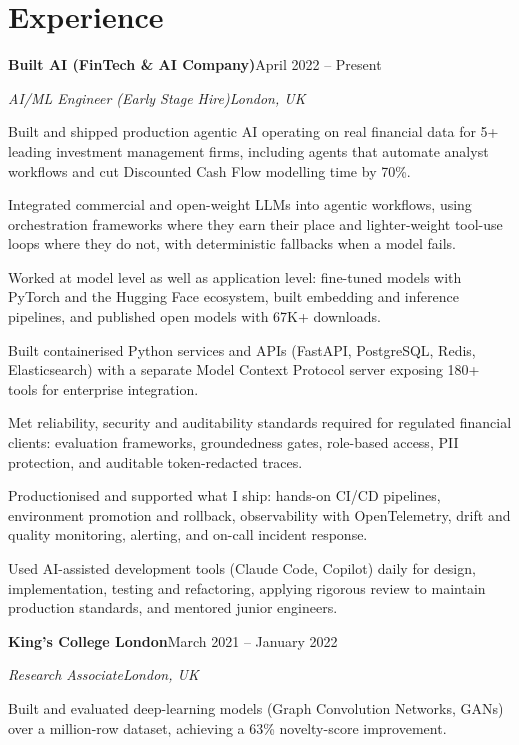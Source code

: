 \documentclass[10pt,a4paper]{article}
\newcommand{\entry}[4]{%
  {\color{company}\bfseries #1}\hfill {\color{muted}#2}\par
  \vspace{1pt}
  {\itshape #3}\hfill {\color{muted}\itshape #4}\par
  \vspace{3pt}%
}
\begin{document}
\section{Experience}
\entry{Built AI (FinTech \& AI Company)}{April 2022 -- Present}{AI/ML Engineer (Early Stage Hire)}{London, UK}
\begin{tight}
  \item Built and shipped production agentic AI operating on real financial data for 5+ leading investment management firms, including agents that automate analyst workflows and cut Discounted Cash Flow modelling time by 70\%.
  \item Integrated commercial and open-weight LLMs into agentic workflows, using orchestration frameworks where they earn their place and lighter-weight tool-use loops where they do not, with deterministic fallbacks when a model fails.
  \item Worked at model level as well as application level: fine-tuned models with PyTorch and the Hugging Face ecosystem, built embedding and inference pipelines, and published open models with 67K+ downloads.
  \item Built containerised Python services and APIs (FastAPI, PostgreSQL, Redis, Elasticsearch) with a separate Model Context Protocol server exposing 180+ tools for enterprise integration.
  \item Met reliability, security and auditability standards required for regulated financial clients: evaluation frameworks, groundedness gates, role-based access, PII protection, and auditable token-redacted traces.
  \item Productionised and supported what I ship: hands-on CI/CD pipelines, environment promotion and rollback, observability with OpenTelemetry, drift and quality monitoring, alerting, and on-call incident response.
  \item Used AI-assisted development tools (Claude Code, Copilot) daily for design, implementation, testing and refactoring, applying rigorous review to maintain production standards, and mentored junior engineers.
\end{tight}

\entry{King's College London}{March 2021 -- January 2022}{Research Associate}{London, UK}
\begin{tight}
  \item Built and evaluated deep-learning models (Graph Convolution Networks, GANs) over a million-row dataset, achieving a 63\% novelty-score improvement.
\end{tight}
\end{document}
